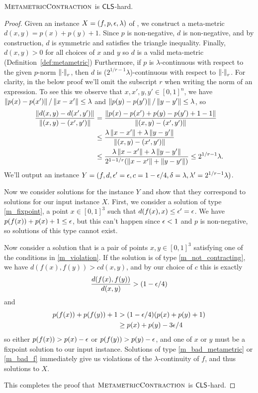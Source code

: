 \begin{theorem}
\label{thm:MMCMisCLShard}
  $\textsc{MetametricContraction}$ is $\mathsf{CLS}$-hard.
\end{theorem}
\begin{proof}
  Given an instance $X = (f,p,\epsilon,\lambda)$ of \CLO, we construct a meta-metric $d(x,y) = p(x) + p(y) + 1$. 
	Since $p$ is non-negative, $d$ is non-negative, and by construction, $d$ is symmetric and satisfies the triangle inequality. Finally, $d(x,y) > 0$ for all choices of $x$ and $y$ so $d$ is a valid meta-metric (Definition~\ref{def:metametric}) Furthermore, if $p$ is $\lambda$-continuous with respect to the given $p$-norm $\left\| \cdot \right\|_r$, then $d$ is ($2^{1/r-1}\lambda$)-continuous with respect to $\left\| \cdot \right\|_r$. For clarity, in the below proof we'll omit the subscript $r$ when writing the norm of an expression. To see this we observe that $x,x',y,y'\in [0,1]^n$, we have $\left\| p(x)-p(x') \right\|/\left\| x-x' \right\| \leq \lambda$ and $\left\| p(y) - p(y') \right\|/\left\| y-y' \right\| \leq \lambda$, so
  \begin{align*}
    \frac{\left\| d(x,y) - d(x',y') \right\|}{\left\| (x,y) - (x',y') \right\|}
    &= \frac{\left\| p(x) - p(x') + p(y) - p(y') + 1 - 1 \right\|}{\left\| (x,y) -(x',y') \right\|}\\
    &\leq \frac{\lambda\left\| x-x' \right\| + \lambda\left\| y-y' \right\|}{\left\| (x,y) -(x',y') \right\|}\\
    &\leq \frac{\lambda\left\| x-x' \right\| + \lambda\left\| y-y' \right\|}{2^{1-1/r}(\left\| x-x' \right\| + \left\| y-y' \right\|)} \leq 2^{1/r-1}\lambda \text{.}
  \end{align*}
We'll output an instance $Y = (f,d,\epsilon'=\epsilon,c = 1-\epsilon/4,\delta=\lambda, \lambda'=2^{1/r-1}\lambda)$.

Now we consider solutions for the instance $Y$ and show that they correspond to solutions for our input instance $X$.
%
First, we consider a solution of type \ref{m_fixpoint}, a point $x\in [0,1]^3$ such that $d(f(x),x) \leq \epsilon'=\epsilon$. We have $p(f(x)) + p(x) + 1 \leq \epsilon$, but this can't happen since $\epsilon < 1$ and $p$ is non-negative, so solutions of this type cannot exist.

Now consider a solution that is a pair of points $x,y\in [0,1]^3$ satisfying one of the conditions in \ref{m_violation}. If the solution is of type \ref{m_not_contracting}, we have $d(f(x),f(y)) > c d(x,y)$, and by our choice of $c$ this is exactly
\[\frac{d(f(x),f(y))}{d(x,y)} > (1-\epsilon/4)\] and
\begin{align*}
  p(f(x)) + p(f(y)) + 1 &> (1-\epsilon/4) (p(x) + p(y) + 1)\\
                        &\geq p(x) + p(y) - 3\epsilon/4
\end{align*}
so either $p(f(x)) > p(x) - \epsilon$ or $p(f(y)) > p(y) - \epsilon$, and one of $x$ or $y$ must be a fixpoint solution to our input instance.
%
Solutions of type \ref{m_bad_metametric} or \ref{m_bad_f} immediately give us violations of the $\lambda$-continuity of $f$, and thus solutions to $X$.

This completes the proof that $\textsc{MetametricContraction}$ is $\mathsf{CLS}$-hard.
\end{proof}

